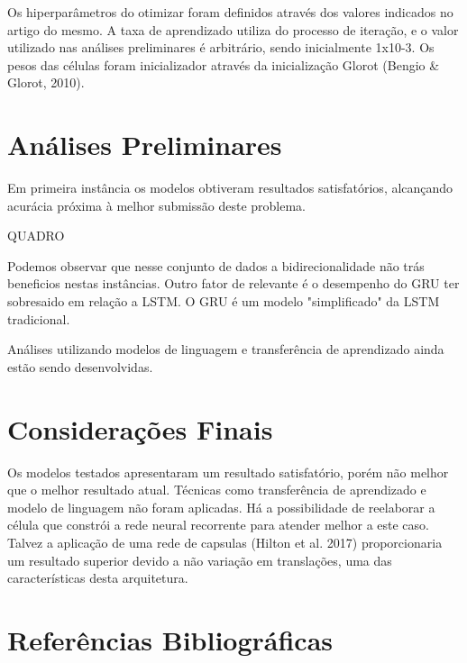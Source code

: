 \documentclass[12pt]{article}
\begin{document}
Os hiperparâmetros do otimizar foram definidos através dos valores indicados no artigo do mesmo. A taxa de aprendizado utiliza do processo de iteração, e o valor utilizado nas análises preliminares é arbitrário, sendo inicialmente 1x10-3. Os pesos das células foram inicializador através da inicialização Glorot (Bengio & Glorot, 2010).

\section{Análises Preliminares}

Em primeira instância os modelos obtiveram resultados satisfatórios, alcançando acurácia próxima à melhor submissão deste problema.

QUADRO

Podemos observar que nesse conjunto de dados a bidirecionalidade não trás beneficios nestas instâncias. Outro fator de relevante é o desempenho do GRU ter sobresaido em relação a LSTM. O GRU é um modelo "simplificado" da LSTM tradicional.

Análises utilizando modelos de linguagem e transferência de aprendizado ainda estão sendo desenvolvidas.

\section{Considerações Finais}

Os modelos testados apresentaram um resultado satisfatório, porém não melhor que o melhor resultado atual. Técnicas como transferência de aprendizado e modelo de linguagem não foram aplicadas. Há a possibilidade de reelaborar a célula que constrói a rede neural recorrente para atender melhor a este caso. Talvez a aplicação de uma rede de capsulas (Hilton et al. 2017) proporcionaria um resultado superior devido a não variação em translações, uma das características desta arquitetura. 

\section{Referências Bibliográficas}



\end{document}
